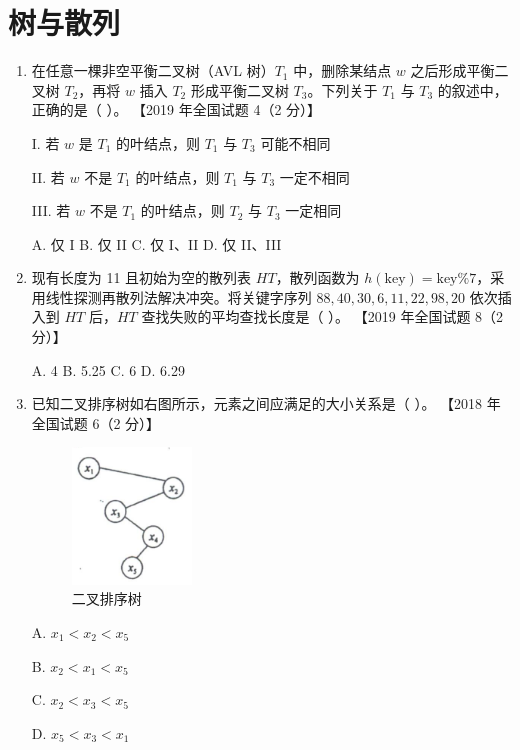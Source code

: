 \documentclass[lang=cn,newtx,10pt,scheme=chinese]{elegantbook}
\begin{document}
\chapter{树与散列}


\begin{enumerate}
    \item 在任意一棵非空平衡二叉树（AVL 树）$T_1$ 中，删除某结点 $w$ 之后形成平衡二叉树 $T_2$，再将 $w$ 插入 $T_2$ 形成平衡二叉树 $T_3$。下列关于 $T_1$ 与 $T_3$ 的叙述中，正确的是（ ）。  
    【2019 年全国试题 4（2 分）】  

    I. 若 $w$ 是 $T_1$ 的叶结点，则 $T_1$ 与 $T_3$ 可能不相同  

    II. 若 $w$ 不是 $T_1$ 的叶结点，则 $T_1$ 与 $T_3$ 一定不相同  

    III. 若 $w$ 不是 $T_1$ 的叶结点，则 $T_2$ 与 $T_3$ 一定相同  

    A. 仅 I \quad B. 仅 II \quad C. 仅 I、II \quad D. 仅 II、III  

    \item 现有长度为 11 且初始为空的散列表 $HT$，散列函数为 $h(\text{key}) = \text{key} \% 7$，采用线性探测再散列法解决冲突。将关键字序列 $88, 40, 30, 6, 11, 22, 98, 20$ 依次插入到 $HT$ 后，$HT$ 查找失败的平均查找长度是（ ）。  
    【2019 年全国试题 8（2 分）】  

    A. 4 \quad B. 5.25 \quad C. 6 \quad D. 6.29  

    \item 已知二叉排序树如右图所示，元素之间应满足的大小关系是（ ）。  
    【2018 年全国试题 6（2 分）】  

    \begin{figure}[h!]
        \centering
        \includegraphics[width=0.3\textwidth]{./figure/exercisePicPDF/chapter9/9-3.pdf}
        \caption{二叉排序树}
    \end{figure}
    A. $x_1 < x_2 < x_5$ 

    B. $x_2 < x_1 < x_5$  

    C. $x_2 < x_3 < x_5$  

    D. $x_5 < x_3 < x_1$  


\end{enumerate}
\end{document}
